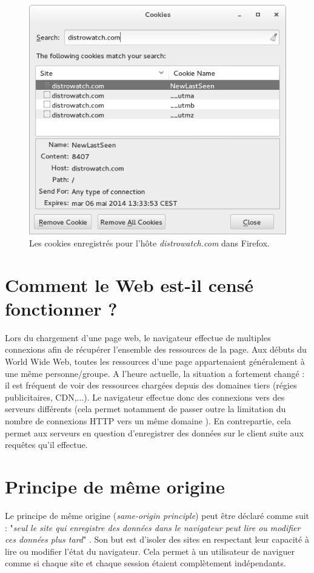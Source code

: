 \begin{figure}[h]
	\centering
	\includegraphics[scale=0.7]{figures/cookies_distrowatch_NB.png}
	\caption{\label{cookies_distrowatch}Les cookies enregistrés pour l'hôte \textit{distrowatch.com} dans Firefox.}
\end{figure}


\section{Comment le Web est-il censé fonctionner ?}
Lors du chargement d'une page web, le navigateur effectue de multiples connexions afin de récupérer l'ensemble des ressources de la page. Aux débuts du World Wide Web, toutes les ressources d'une page appartenaient généralement à une même personne/groupe. A l'heure actuelle, la situation a fortement changé : il est fréquent de voir des ressources chargées depuis des domaines tiers (régies publicitaires, CDN,...). Le navigateur effectue donc des connexions vers des serveurs différents (cela permet notamment de passer outre la limitation du nombre de connexions HTTP vers un même domaine \cite{IETF_RFC2616}). En contrepartie, cela permet aux serveurs en question d'enregistrer des données sur le client suite aux requêtes qu'il effectue.


\section{Principe de même origine}
\label{sop}
Le principe de même origine (\textit{same-origin principle}) peut être déclaré comme suit : "\textit{seul le site qui enregistre des données dans le navigateur peut lire ou modifier ces données plus tard}" \cite{Jackson:2006:PBS:1135777.1135884}. Son but est d'isoler des sites en respectant leur capacité à lire ou modifier l'état du navigateur. Cela permet à un utilisateur de naviguer comme si chaque site et chaque session étaient complètement indépendants.
\newline

